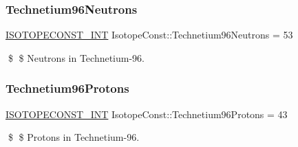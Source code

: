 \subsubsection{\texorpdfstring{Technetium96\+Neutrons}{Technetium96Neutrons}}
{\footnotesize\ttfamily \mbox{\hyperlink{group___isotope_const-_macros_ga5f18360b3e99483a35c32d789e62621c}{I\+S\+O\+T\+O\+P\+E\+C\+O\+N\+S\+T\+\_\+\+I\+NT}} Isotope\+Const\+::\+Technetium96\+Neutrons = 53}

\$ \$ Neutrons in Technetium-\/96. \mbox{\label{group___isotope_const-_technetium-_tc96_gad43ef72999175f84457dc03a4c30cd80}} 
\subsubsection{\texorpdfstring{Technetium96\+Protons}{Technetium96Protons}}
{\footnotesize\ttfamily \mbox{\hyperlink{group___isotope_const-_macros_ga5f18360b3e99483a35c32d789e62621c}{I\+S\+O\+T\+O\+P\+E\+C\+O\+N\+S\+T\+\_\+\+I\+NT}} Isotope\+Const\+::\+Technetium96\+Protons = 43}

\$ \$ Protons in Technetium-\/96. 